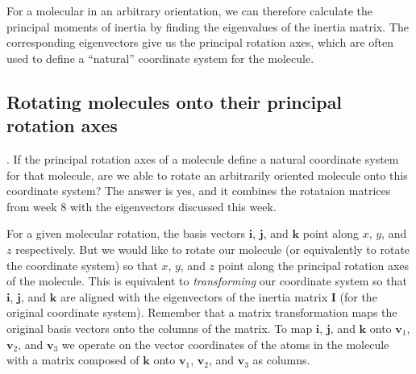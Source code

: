 \documentclass[a4paper]{article}
\newcommand{\bvec}[1]{\boldsymbol{\mathbf{#1}}}
\begin{document}
For a molecular in an arbitrary orientation, we can therefore calculate the principal moments of inertia by finding the eigenvalues of the inertia matrix. The corresponding eigenvectors give us the principal rotation axes, which are often used to define a ``natural'' coordinate system for the molecule.

\subsection{Rotating molecules onto their principal rotation axes}.
If the principal rotation axes of a molecule define a natural coordinate system for that molecule, are we able to rotate an arbitrarily oriented molecule onto this coordinate system? The answer is yes, and it combines the rotataion matrices from week 8 with the eigenvectors discussed this week.

For a given molecular rotation, the basis vectors $\bvec{i}$, $\bvec{j}$, and $\bvec{k}$ point along $x$, $y$, and $z$ respectively. But we would like to rotate our molecule (or equivalently to rotate the coordinate system) so that $x$, $y$, and $z$ point along the principal rotation axes of the molecule. This is equivalent to \emph{transforming} our coordinate system so that $\bvec{i}$, $\bvec{j}$, and $\bvec{k}$ are aligned with the eigenvectors of the inertia matrix $\bvec{I}$ (for the original coordinate system). Remember that a matrix transformation maps the original basis vectors onto the columns of the matrix. To map $\bvec{i}$, $\bvec{j}$, and $\bvec{k}$ onto $\bvec{v}_1$, $\bvec{v}_2$, and $\bvec{v}_3$ we operate on the vector coordinates of the atoms in the molecule with a matrix composed of $\bvec{k}$ onto $\bvec{v}_1$, $\bvec{v}_2$, and $\bvec{v}_3$ as columns.
\end{document}
